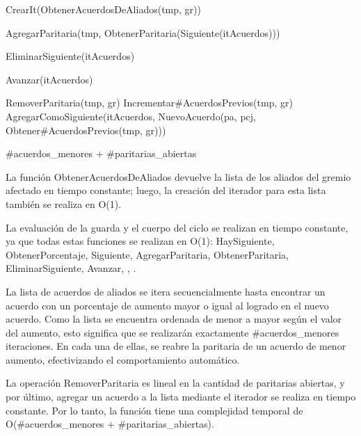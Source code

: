 {

	\state {} \asig CrearIt(ObtenerAcuerdosDeAliados(tmp, gr))		
			
		\state

		\state AgregarParitaria(tmp, ObtenerParitaria(Siguiente(itAcuerdos)))		

		\state EliminarSiguiente(itAcuerdos)										

		\state
		\state Avanzar(itAcuerdos)													
	\endwhile
	\state

	\state {} \asig RemoverParitaria(tmp, gr)											
	\state Incrementar\#AcuerdosPrevios(tmp, gr)														
	\state AgregarComoSiguiente(itAcuerdos, NuevoAcuerdo(pa, pcj, Obtener\#AcuerdosPrevios(tmp, gr)))	
}
{\#acuerdos\_menores + \#paritarias\_abiertas}
{La funci\'on ObtenerAcuerdosDeAliados devuelve la lista de los aliados del gremio afectado en tiempo constante; luego, la creaci\'on del iterador para esta lista tambi\'en se realiza en O(1). 

\hspace{10pt} La evaluaci\'on de la guarda y el cuerpo del ciclo se realizan en tiempo constante, ya que todas estas funciones se realizan en O(1): HaySiguiente, ObtenerPorcentaje, Siguiente, AgregarParitaria, ObtenerParitaria, EliminarSiguiente, Avanzar, \lyl, \menor.

\hspace{10pt} La lista de acuerdos de aliados se itera secuencialmente hasta encontrar un acuerdo con un porcentaje de aumento mayor o igual al logrado en el nuevo acuerdo. Como la lista se encuentra ordenada de menor a mayor seg\'un el valor del aumento, esto significa que se realizar\'an exactamente \#acuerdos\_menores iteraciones. En cada una de ellas, se reabre la paritaria de un acuerdo de menor aumento, efectivizando el comportamiento autom\'atico.

\hspace{10pt} La operaci\'on RemoverParitaria es lineal en la cantidad de paritarias abiertas, y por \'ultimo, agregar un acuerdo a la lista mediante el iterador se realiza en tiempo constante. Por lo tanto, la funci\'on tiene una complejidad temporal de O(\#acuerdos\_menores + \#paritarias\_abiertas).  }

